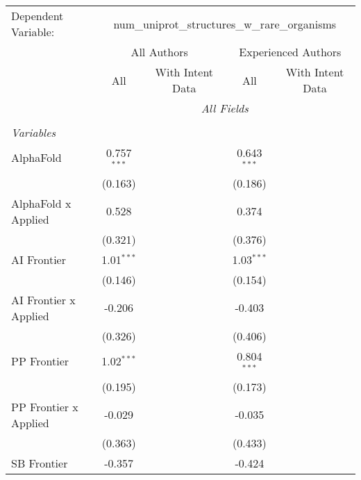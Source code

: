 \begingroup
\centering
\begin{tabular}{lcccccc}
   \tabularnewline \midrule \midrule
   Dependent Variable: & \multicolumn{6}{c}{num\_uniprot\_structures\_w\_rare\_organisms}\\
 & \multicolumn{3}{c}{All Authors} & \multicolumn{3}{c}{Experienced Authors} \\
\cmidrule(lr){2-4} \cmidrule(lr){5-7}
 & \multicolumn{1}{c}{All} & \multicolumn{2}{c}{With Intent Data} & \multicolumn{1}{c}{All} & \multicolumn{2}{c}{With Intent Data} \\
\cmidrule(lr){2-2} \cmidrule(lr){3-4} \cmidrule(lr){5-5} \cmidrule(lr){6-7}
 & \multicolumn{6}{c}{\textit{All Fields}} \\ \\
   \emph{Variables}\\
   AlphaFold             & 0.757$^{***}$ &         &         & 0.643$^{***}$ &         &   \\   
                         & (0.163)       &         &         & (0.186)       &         &   \\   
   AlphaFold x Applied   & 0.528         &         &         & 0.374         &         &   \\   
                         & (0.321)       &         &         & (0.376)       &         &   \\   
   AI Frontier           & 1.01$^{***}$  &         &         & 1.03$^{***}$  &         &   \\   
                         & (0.146)       &         &         & (0.154)       &         &   \\   
   AI Frontier x Applied & -0.206        &         &         & -0.403        &         &   \\   
                         & (0.326)       &         &         & (0.406)       &         &   \\   
   PP Frontier           & 1.02$^{***}$  &         &         & 0.804$^{***}$ &         &   \\   
                         & (0.195)       &         &         & (0.173)       &         &   \\   
   PP Frontier x Applied & -0.029        &         &         & -0.035        &         &   \\   
                         & (0.363)       &         &         & (0.433)       &         &   \\   
   SB Frontier           & -0.357        &         &         & -0.424        &         &   \\   

\end{tabular}
